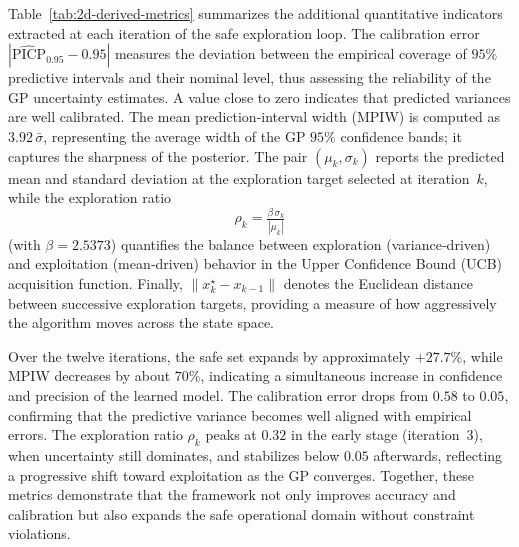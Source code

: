 \documentclass[10pt]{article}
\newcommand{\1}{\mathbbm{1}}
\begin{document}
Table~\ref{tab:2d-derived-metrics} summarizes the additional quantitative indicators extracted at each iteration of the safe exploration loop. 
The calibration error $|\widehat{\mathrm{PICP}}_{0.95}-0.95|$ measures the deviation between the empirical coverage of $95\%$ predictive intervals and their nominal level, thus assessing the reliability of the GP uncertainty estimates. 
A value close to zero indicates that predicted variances are well calibrated. 
The mean prediction‐interval width (MPIW) is computed as $3.92\,\bar\sigma$, representing the average width of the GP $95\%$ confidence bands; it captures the sharpness of the posterior. 
The pair $(\mu_k,\sigma_k)$ reports the predicted mean and standard deviation at the exploration target selected at iteration~$k$, while the exploration ratio
\[
\rho_k=\tfrac{\beta\,\sigma_k}{|\mu_k|}
\]
(with $\beta=2.5373$) quantifies the balance between exploration (variance‐driven) and exploitation (mean‐driven) behavior in the Upper Confidence Bound (UCB) acquisition function. 
Finally, $\|x_k^\star-x_{k-1}\|$ denotes the Euclidean distance between successive exploration targets, providing a measure of how aggressively the algorithm moves across the state space.

\medskip
\noindent
Over the twelve iterations, the safe set expands by approximately $+27.7\%$, while MPIW decreases by about $70\%$, indicating a simultaneous increase in confidence and precision of the learned model. 
The calibration error drops from $0.58$ to $0.05$, confirming that the predictive variance becomes well aligned with empirical errors. 
The exploration ratio $\rho_k$ peaks at $0.32$ in the early stage (iteration~3), when uncertainty still dominates, and stabilizes below $0.05$ afterwards, reflecting a progressive shift toward exploitation as the GP converges. 
Together, these metrics demonstrate that the framework not only improves accuracy and calibration but also expands the safe operational domain without constraint violations.
\end{document}

